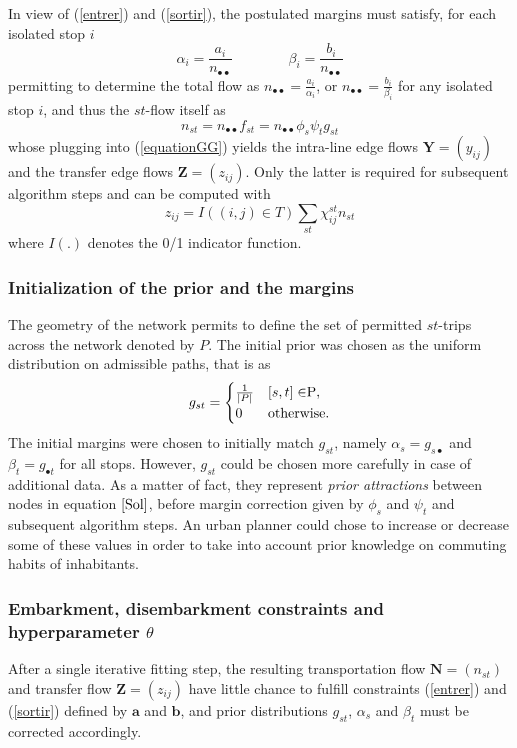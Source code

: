 \documentclass{bmcart}
\begin{document}
In view of (\ref{entrer}) and (\ref{sortir}), the postulated margins must satisfy, for each isolated stop $i$
\begin{equation}
\label{ }
\alpha_i=\frac{a_i}{n_{\bullet \bullet}}\qquad\qquad \beta_i=\frac{b_i}{n_{\bullet \bullet}}
\end{equation}
permitting to determine the total flow as $n_{\bullet \bullet}=\frac{a_i}{\alpha_i}$, or  $n_{\bullet \bullet}=\frac{b_i}{\beta_i}$ for any isolated stop $i$, and thus 
the $st$-flow itself as 
\begin{equation}
	\label{flow_from_distrib}
	n_{st} = n_{\bullet \bullet} f_{st}= n_{\bullet \bullet}\phi_s \psi_t g_{st} 
\end{equation}
whose plugging into (\ref{equationGG}) yields the intra-line edge flows $\mathbf{Y}=(y_{ij})$ and the transfer edge flows $\mathbf{Z}=(z_{ij})$. Only the latter is required for subsequent algorithm steps and can be computed with 
\begin{equation}
	z_{ij} = I((i,j) \in T)\sum_{st} \chi_{ij}^{st} n_{st}
\end{equation}
where $I(.)$ denotes the 0/1 indicator function.
\subsubsection{Initialization of the prior and the margins}
The geometry of the network permits to define the set of permitted $st$-trips across the network denoted by $P$. The initial prior was chosen as the uniform distribution on admissible paths, that is as
\begin{equation*}
g_{st} = \begin{cases}
  \frac{1}{\vert P \vert}    & [s, t] \in $P$, \\
  0    & \text{otherwise}.
\end{cases}
\end{equation*}
The initial margins were chosen to initially match $g_{st}$, namely $\alpha_s=g_{s \bullet}$ and $\beta_t=g_{\bullet t}$ for all stops. However, $g_{st}$ could be chosen more carefully in case of additional data. As a matter of fact, they represent \emph{prior attractions} between nodes in equation $\ref{Sol}$, before margin correction given by $\phi_s$ and $\psi_t$ and subsequent algorithm steps. An urban planner could chose to increase or decrease some of these values in order to take into account prior knowledge on commuting habits of inhabitants.

\subsubsection{Embarkment, disembarkment constraints and hyperparameter $\theta$}
\label{constraints}
After a single iterative fitting step, the resulting transportation flow $\mathbf{N}=(n_{st})$ and transfer flow $\mathbf{Z}=(z_{ij})$ have little chance to fulfill constraints (\ref{entrer}) and (\ref{sortir}) defined by $\mathbf{a}$ and $\mathbf{b}$, and prior distributions $g_{st}$, $\alpha_s$ and $\beta_t$ must be corrected accordingly.
\end{document}
